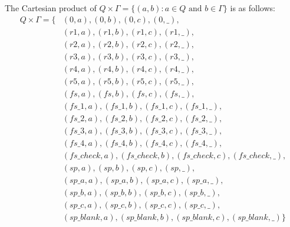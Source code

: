 \documentclass[12pt, a4paper]{report}
\begin{document}
{	The Cartesian product of $Q \times \Gamma = \{(a,b) : a \in Q \text{~and~} b \in \Gamma \}$ is as follows:
		\begin{equation}\label{eq:Q_times_Gamma}
		\begin{aligned}
		Q \times \Gamma = \{
		    & (0,a),(0,b),(0,c),(0,\_),\\
			& (r1,a),(r1,b),(r1,c),(r1,\_),\\
			& (r2,a),(r2,b),(r2,c),(r2,\_),\\
			& (r3,a),(r3,b),(r3,c),(r3,\_),\\
			& (r4,a),(r4,b),(r4,c),(r4,\_),\\
			& (r5,a),(r5,b),(r5,c),(r5,\_),\\
			& (fs,a),(fs,b),(fs,c),(fs,\_),\\
			& (fs\_1,a),(fs\_1,b),(fs\_1,c),(fs\_1,\_),\\
			& (fs\_2,a),(fs\_2,b),(fs\_2,c),(fs\_2,\_),\\
			& (fs\_3,a),(fs\_3,b),(fs\_3,c),(fs\_3,\_),\\
			& (fs\_4,a),(fs\_4,b),(fs\_4,c),(fs\_4,\_),\\
			& (fs\_check,a),(fs\_check,b),(fs\_check,c),(fs\_check,\_),\\
			& (sp,a),(sp,b),(sp,c),(sp,\_),\\
			& (sp\_a,a),(sp\_a,b),(sp\_a,c),(sp\_a,\_),\\
			& (sp\_b,a),(sp\_b,b),(sp\_b,c),(sp\_b,\_),\\
			& (sp\_c,a),(sp\_c,b),(sp\_c,c),(sp\_c,\_),\\
			& (sp\_blank,a),(sp\_blank,b),(sp\_blank,c),(sp\_blank,\_) \}
		\end{aligned}
		\end{equation}
		
}
\end{document}
